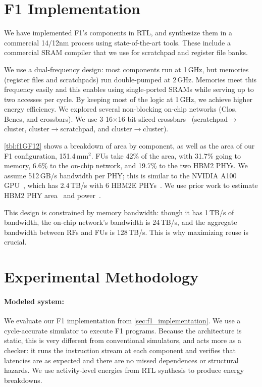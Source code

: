 \section{F1 Implementation}
\label{sec:f1_implementation}

We have implemented F1's components in RTL, and synthesize them in a commercial
14/12nm process using state-of-the-art tools. These include a commercial SRAM
compiler that we use for scratchpad and register file banks.

We use a dual-frequency design: most components run at 1\,GHz, but memories
(register files and scratchpads) run double-pumped at 2\,GHz. Memories meet
this frequency easily and this enables using single-ported SRAMs while serving
up to two accesses per cycle. By keeping most of the logic at 1\,GHz, we
achieve higher energy efficiency. We explored several non-blocking on-chip
networks (Clos, Benes, and crossbars). We use 3 16$\times$16 bit-sliced
crossbars~\cite{passas:tocaid12:crossbar} (scratch\-pad$\rightarrow$cluster,
cluster$\rightarrow$scratchpad, and cluster$\rightarrow$cluster).

\autoref{tbl:f1GF12} shows a breakdown of area by component, as well as the
area of our F1 configuration, 151.4\,mm$^2$. FUs take 42\% of the area, with
31.7\% going to memory, 6.6\% to the on-chip network, and 19.7\% to the two
HBM2 PHYs. We assume 512\,GB/s bandwidth per PHY; this is similar to the NVIDIA
A100 GPU~\cite{choquette2021nvidia}, which has 2.4\,TB/s with 6 HBM2E
PHYs~\cite{nvidiadgx}. We use prior work to estimate HBM2 PHY
area~\cite{rambuswhite, dasgupta20208} and power~\cite{rambuswhite,
ge2011design}.

This design is constrained by memory bandwidth: though it has 1\,TB/s of
bandwidth, the on-chip network's bandwidth is 24\,TB/s, and the aggregate
bandwidth between RFs and FUs is 128\,TB/s. This is why maximizing reuse is
crucial.

\section{Experimental Methodology}
\label{sec:f1_methodology}

\paragraph{Modeled system:}
We evaluate our F1 implementation from \autoref{sec:f1_implementation}. We use a
cycle-accurate simulator to execute F1 programs. Because the architecture is
static, this is very different from conventional simulators, and acts more as a
checker: it runs the instruction stream at each component and verifies that
latencies are as expected and there are no missed dependences or structural
hazards. We use activity-level energies from RTL synthesis to produce energy
breakdowns.

